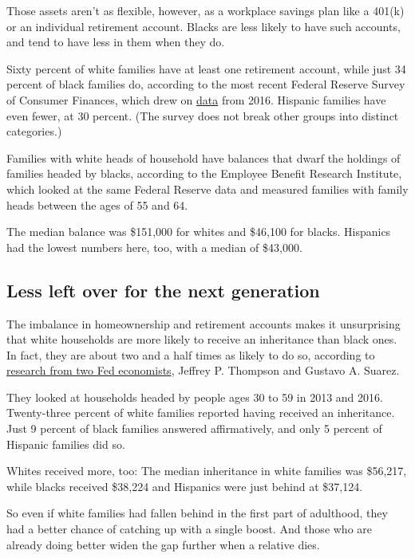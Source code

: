 Those assets aren't as flexible, however, as a workplace savings plan
like a 401(k) or an individual retirement account. Blacks are less
likely to have such accounts, and tend to have less in them when they
do.

Sixty percent of white families have at least one retirement account,
while just 34 percent of black families do, according to the most recent
Federal Reserve Survey of Consumer Finances, which drew on
\href{https://www.federalreserve.gov/econres/notes/feds-notes/recent-trends-in-wealth-holding-by-race-and-ethnicity-evidence-from-the-survey-of-consumer-finances-20170927.htm}{data}
from 2016. Hispanic families have even fewer, at 30 percent. (The survey
does not break other groups into distinct categories.)

Families with white heads of household have balances that dwarf the
holdings of families headed by blacks, according to the Employee Benefit
Research Institute, which looked at the same Federal Reserve data and
measured families with family heads between the ages of 55 and 64.

The median balance was \$151,000 for whites and \$46,100 for blacks.
Hispanics had the lowest numbers here, too, with a median of \$43,000.

\hypertarget{less-left-over-for-the-next-generation}{%
\subsection{Less left over for the next
generation}\label{less-left-over-for-the-next-generation}}

The imbalance in homeownership and retirement accounts makes it
unsurprising that white households are more likely to receive an
inheritance than black ones. In fact, they are about two and a half
times as likely to do so, according to
\href{https://www.federalreserve.gov/econres/feds/files/2015076r1pap.pdf}{research
from two Fed economists}, Jeffrey P. Thompson and Gustavo A. Suarez.

They looked at households headed by people ages 30 to 59 in 2013 and
2016. Twenty-three percent of white families reported having received an
inheritance. Just 9 percent of black families answered affirmatively,
and only 5 percent of Hispanic families did so.

Whites received more, too: The median inheritance in white families was
\$56,217, while blacks received \$38,224 and Hispanics were just behind
at \$37,124.

So even if white families had fallen behind in the first part of
adulthood, they had a better chance of catching up with a single boost.
And those who are already doing better widen the gap further when a
relative dies.

